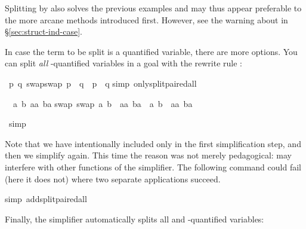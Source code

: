 \begin{isabellebody}
\begin{isamarkuptxt}
Splitting by  also solves the previous examples and may thus
appear preferable to the more arcane methods introduced first. However, see
the warning about  in \S\ref{sec:struct-ind-case}.

In case the term to be split is a quantified variable, there are more options.
You can split \emph{all} \isa{{\isasymAnd}}-quantified variables in a goal
with the rewrite rule :%
\end{isamarkuptxt}%
\ {\isachardoublequote}{\isasymAnd}p\ q{\isachardot}\ swap{\isacharparenleft}swap\ p{\isacharparenright}\ {\isacharequal}\ q\ {\isasymlongrightarrow}\ p\ {\isacharequal}\ q{\isachardoublequote}\isanewline
{}simp\ only{\isacharcolon}split{\isacharunderscore}paired{\isacharunderscore}all{\isacharparenright}%
\begin{isamarkuptxt}%
\noindent
\begin{isabelle}%
\ {}{\isachardot}\ {\isasymAnd}a\ b\ aa\ ba{\isachardot}\isanewline
{}swap\ {\isacharparenleft}swap\ {\isacharparenleft}a{\isacharcomma}\ b{\isacharparenright}{\isacharparenright}\ {\isacharequal}\ {\isacharparenleft}aa{\isacharcomma}\ ba{\isacharparenright}\ {\isasymlongrightarrow}\ {\isacharparenleft}a{\isacharcomma}\ b{\isacharparenright}\ {\isacharequal}\ {\isacharparenleft}aa{\isacharcomma}\ ba{\isacharparenright}%
\end{isabelle}%
\end{isamarkuptxt}%
\ simp\isanewline
{}%
\begin{isamarkuptext}%
\noindent
Note that we have intentionally included only 
in the first simplification step, and then we simplify again. 
This time the reason was not merely
pedagogical:
 may interfere with other functions
of the simplifier.
The following command could fail (here it does not)
where two separate  applications succeed.%
\end{isamarkuptext}%
simp\ add{\isacharcolon}split{\isacharunderscore}paired{\isacharunderscore}all{\isacharparenright}%
\begin{isamarkuptext}%
\noindent
Finally, the simplifier automatically splits all \isa{{\isasymforall}} and
\isa{{\isasymexists}}-quantified variables:%

\end{isamarkuptext}
\end{isabellebody}
